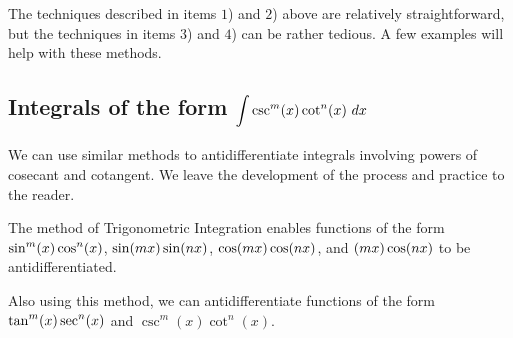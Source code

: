 The techniques described in items $1$) and $2$) above are relatively straightforward, but the techniques in items $3$) and $4$) can be rather tedious. A few examples will help with these methods.




\subsection*{Integrals of the form $\displaystyle\int\csc^m(x)\cot^n(x)\ dx$} 

We can use similar methods to antidifferentiate integrals involving powers of cosecant and cotangent.  We leave the development of the process and practice to the reader.

\begin{summary}
\item The method of Trigonometric Integration enables functions of the form $\displaystyle \sin^m (x) \cos^n (x)$, $\displaystyle \sin(mx)\sin(nx)$, $\displaystyle \cos(mx) \cos(nx)$, and $\displaystyle (mx)\cos(nx)$ to be antidifferentiated.
\item Also using this method, we can antidifferentiate functions of the form $\displaystyle \tan^m(x)\sec^n(x)$ and $\csc^m(x)\cot^n(x)$.
\end{summary}

\clearpage

 

\cleardoublepage
